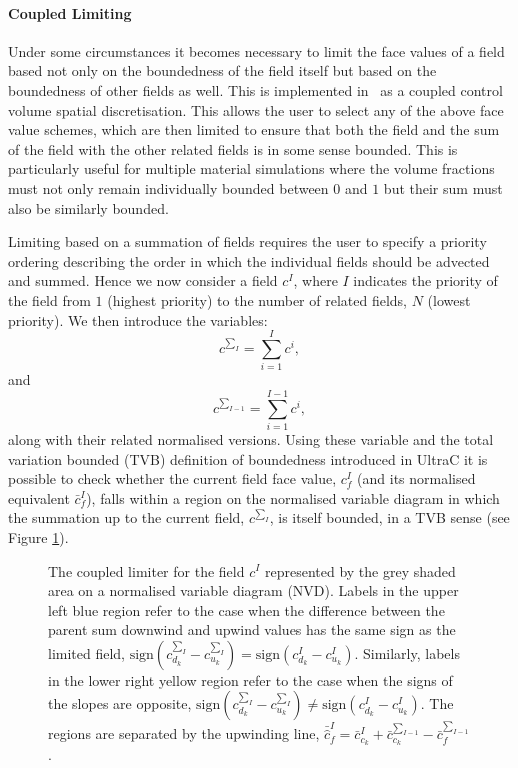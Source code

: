\paragraph{Coupled Limiting} \label{sec:coupledlimiter}

Under some circumstances it becomes necessary to limit the face values of a field based not only on the boundedness of the field itself but based on the boundedness of other fields as well.  This is implemented in \fluidity\ as a coupled control volume spatial discretisation.  This allows the user to select any of the above face value schemes, which are then limited to ensure that both the field and the sum of the field with the other related fields is in some sense bounded.  This is particularly useful for multiple material simulations where the volume fractions must not only remain individually bounded between $0$ and $1$ but their sum must also be similarly bounded.

Limiting based on a summation of fields requires the user to specify a priority ordering describing the order in which the individual fields should be advected and summed.  Hence we now consider a field $c^I$, where $I$ indicates the priority of the field from $1$ (highest priority) to the number of related fields, $N$ (lowest priority).  We then introduce the variables:
\begin{equation}
c^{\sum_{I}} = \sum_{i=1}^I c^i,
\end{equation}
and
\begin{equation}
c^{\sum_{I-1}} = \sum_{i=1}^{I-1} c^i,
\end{equation}
along with their related normalised versions.  Using these variable and the total variation bounded (TVB) definition of boundedness introduced in UltraC it is possible to check whether the current field face value, $c_{f}^I$ (and its normalised equivalent $\bar{c}_{f}^I$), falls within a region on the normalised variable diagram in which the summation up to the current field, $c^{\sum_{I}}$, is itself bounded, in a TVB sense (see Figure \ref{fig:coupledlimiter}).

\begin{figure}[tbp]
\begin{center}
\caption{The coupled limiter for the field $c^I$ represented by the grey shaded area on a normalised variable diagram (NVD).  Labels in the upper left blue region refer to the case when the difference between the parent sum downwind and upwind values has the same sign as the limited field, $\text{sign}\left(c^{\sum_{I}}_{d_k}-c^{\sum_{I}}_{u_k}\right) = \text{sign}\left(c^{I}_{d_k}-c^{I}_{u_k}\right)$.  Similarly, labels in the lower right yellow region refer to the case when the signs of the slopes are opposite, $\text{sign}\left(c^{\sum_{I}}_{d_k}-c^{\sum_{I}}_{u_k}\right) \neq \text{sign}\left(c^{I}_{d_k}-c^{I}_{u_k}\right)$. The regions are separated by the upwinding line, $\bar{\hat{c}}^{I}_{f} = \bar{c}^{I}_{c_k} + \bar{c}^{\sum_{I-1}}_{c_k} - \bar{c}^{\sum_{I-1}}_{f}$.}
\label{fig:coupledlimiter}
\end{center}
\end{figure}

